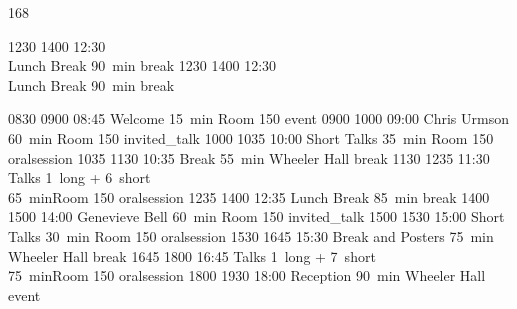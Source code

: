\setslotsize{3cm}{1.3mm}
 {168}
\settextframe{1.5mm}
\setbottomspace{0pt}
\begin{timetable}

   {1230} {1400} {12:30\\\vspace{0.2em}Lunch Break}         {90~min}                {}                   {break}
   {1230} {1400} {12:30\\\vspace{0.2em}Lunch Break}         {90~min}                {}                   {break}

   {0830} {0900} {08:45 Welcome}                      {\vspace{1.5mm}15~min}          {\vspace{1.5mm}Room 150}        {event}
   {0900} {1000} {09:00 Chris Urmson}                 {60~min}                        {Room 150}                      {invited_talk}
   {1000} {1035} {10:00 Short Talks}                  {\vspace{1.5mm}35~min}          {\vspace{1.5mm}Room 150}        {oralsession}
   {1035} {1130} {10:35 Break}                        {\vspace{1.5mm}55~min}          {Wheeler Hall}      {break}
   {1130} {1235} {11:30 Talks}                        {\vspace{-0.5em}1~long + 6~short\\65~min}{Room 150}             {oralsession}
   {1235} {1400} {12:35 Lunch Break}                  {85~min}                        {}                            {break}
   {1400} {1500} {14:00 Genevieve Bell}               {60~min}                        {Room 150}                      {invited_talk}
   {1500} {1530} {15:00 Short Talks} 		      {\vspace{1.5mm}30~min}          {\vspace{1.5mm}Room 150}        {oralsession}
   {1530} {1645} {15:30 Break and Posters}            {\vspace{1.5mm}75~min}          {Wheeler Hall}      {break}
   {1645} {1800} {16:45 Talks}                        {\vspace{-0.5em}1~long + 7~short\\75~min}{Room 150}             {oralsession}
   {1800} {1930} {18:00 Reception}  	              {\vspace{1.5mm}90~min}          {Wheeler Hall}        {event}



\end{timetable}

